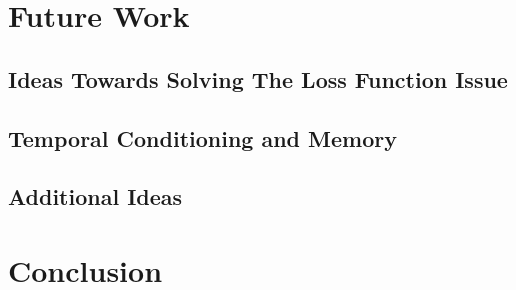 \documentclass[12pt]{article}
\begin{document}
\newpage\section{Future Work} \label{sec:future}
\subsection{Ideas Towards Solving The Loss Function Issue} \label{ssec:61}
\subsection{Temporal Conditioning and Memory} \label{ssec:62}
\subsection{Additional Ideas} \label{ssec:63}

\newpage\section{Conclusion} \label{sec:conclusion}



\newpage
\end{document}
